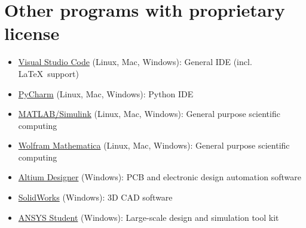\section{Other programs with proprietary license}
\begin{itemize}
	\item \href{https://en.wikipedia.org/wiki/Visual_Studio_Code}{Visual Studio Code} (Linux, Mac, Windows): General IDE (incl. \LaTeX\ support)
	\item \href{https://en.wikipedia.org/wiki/PyCharm}{PyCharm} (Linux, Mac, Windows): Python IDE
	\item \href{https://en.wikipedia.org/wiki/MATLAB}{MATLAB/Simulink} (Linux, Mac, Windows):  General purpose scientific computing
	\item \href{https://en.wikipedia.org/wiki/Wolfram_Mathematica}{Wolfram Mathematica} (Linux, Mac, Windows): General purpose scientific computing
	\item \href{https://en.wikipedia.org/wiki/Altium_Designer}{Altium Designer} (Windows):  PCB and electronic design automation software
	\item \href{https://en.wikipedia.org/wiki/SolidWorks}{SolidWorks} (Windows): 3D CAD software
	\item \href{https://www.ansys.com/de-de/academic/free-student-products}{ANSYS Student} (Windows): Large-scale design and simulation tool kit
\end{itemize}
%
